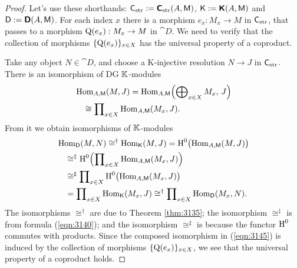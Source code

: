 \begin{proof}
Let's use these shorthands: 
$\operatorname{\mathsf{C}}_{\mathrm{str}} := \boldsymbol{\mathsf{C}}_{\mathrm{str}}(A, \operatorname{\mathsf{M}})$,
$\operatorname{\mathsf{K}} := \boldsymbol{\mathsf{K}}(A, \operatorname{\mathsf{M}})$ and 
$\operatorname{\mathsf{D}} := \boldsymbol{\mathsf{D}}(A, \operatorname{\mathsf{M}})$.
For each index $x$ there is a morphism $e_x : M_x \to M$ in 
$\operatorname{\mathsf{C}}_{\mathrm{str}}$,
that passes to a morphism 
$\operatorname{Q}(e_x) : M_x \to M$ in $\cat{D}$. We need to verify that the collection 
of morphisms $\{ \operatorname{Q}(e_x) \}_{x \in X}$ has the universal property of a 
coproduct. 

Take any object $N \in \cat{D}$, and choose a K-injective 
resolution $N \to J$ in $\operatorname{\mathsf{C}}_{\mathrm{str}}$.
There is an isomorphism of DG $\mathbb{K}$-modules 
\begin{equation} \label{eqn:3140}
\begin{aligned}
&
\operatorname{Hom}_{A, \operatorname{\mathsf{M}}}(M, J) = 
\operatorname{Hom}_{A, \operatorname{\mathsf{M}}} \Bigl( \bigoplus\nolimits_{x \in X} M_x, \, J \Bigr)
\\
& \quad 
\cong \prod\nolimits_{x \in X} \operatorname{Hom}_{A, \operatorname{\mathsf{M}}}(M_x, J) .
\end{aligned}
\end{equation}
From it we obtain isomorphisms of $\mathbb{K}$-modules 
\begin{equation} \label{eqn:3145}
\begin{aligned}
&
\operatorname{Hom}_{\operatorname{\mathsf{D}}}(M, N) \cong^{\dag} \operatorname{Hom}_{\operatorname{\mathsf{K}}}(M, J)
= \operatorname{H}^0 \bigl( \operatorname{Hom}_{A, \operatorname{\mathsf{M}}}(M, J) \bigr) 
\\
& \quad 
\cong^{\ddag} \operatorname{H}^0 \Bigl( 
\prod\nolimits_{x \in X} \operatorname{Hom}_{A, \operatorname{\mathsf{M}}}(M_x, J) \Bigr) 
\\
& \quad 
\cong^{\sharp} \prod\nolimits_{x \in X}
\operatorname{H}^0 \bigl( \operatorname{Hom}_{A, \operatorname{\mathsf{M}}}(M_x, J) \bigr) 
\\
& \quad 
= \prod\nolimits_{x \in X} \operatorname{Hom}_{\operatorname{\mathsf{K}}}(M_x, J)
\cong^{\dag} \prod\nolimits_{x \in X} \operatorname{Hom}_{\operatorname{\mathsf{D}}}(M_x, N) . 
\end{aligned} 
\end{equation}
The isomorphisms $\cong^{\dag}$ are due to Theorem \ref{thm:3135}; the 
isomorphism $\cong^{\ddag}$ is from formula (\ref{eqn:3140}); and the 
isomorphism $\cong^{\sharp}$ is because the functor $\operatorname{H}^0$ commutes 
with products. Since the composed isomorphism in (\ref{eqn:3145}) is induced by 
the collection of morphisms $\{ \operatorname{Q}(e_x) \}_{x \in X}$, we see that the 
universal property of a coproduct holds. 
\end{proof}

